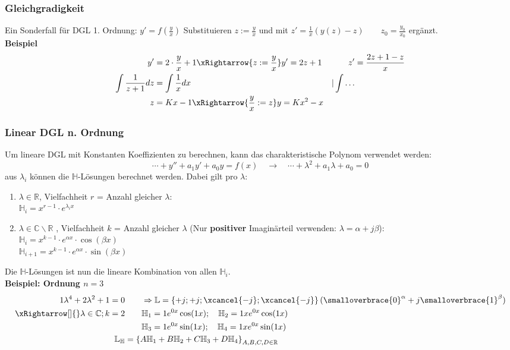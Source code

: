 \subsubsection{Gleichgradigkeit}
Ein Sonderfall für DGL 1. Ordnung: $y' = f(\frac{y}{x})$ Substituieren $z := \frac{y}{x}$ und mit $z' = \frac{1}{x}(y(z) - z)\qquad z_0 = \frac{y_0}{x_0}$ ergänzt.\\
\textbf{Beispiel} 
\begin{align*}
	y' &= 2 \cdot \frac{y}{x} + 1 \xRightarrow{z := \frac{y}{x}} y' = 2z + 1 & 	z' &= \frac{2z + 1 - z}{x}  \\
	\int \frac{1}{z+1}dz &= \int \frac{1}{x}dx & | \int \dots \\
	z &= Kx - 1 \xRightarrow{\frac{y}{x} := z} y = Kx^2 - x
\end{align*}

\subsubsection{Linear DGL n. Ordnung}
Um lineare DGL mit Konstanten Koeffizienten zu berechnen, kann das charakteristische Polynom verwendet werden:
\[
\cdots + y'' + a_1y' + a_0y = f(x) \quad\rightarrow\quad \cdots + \lambda^2 + a_1\lambda + a_0 = 0
\]
aus $\lambda_i$ können die $\mathbb{H}$-Lösungen berechnet werden. Dabei gilt pro $\lambda$:
\begin{enumerate}[nosep]
	\item $\lambda \in \mathbb{R}$, Vielfachheit $r$ = Anzahl gleicher $\lambda$:\\
	$\mathbb{H}_i = x^{r-1} \cdot e^{\lambda_i x}$
	\item $\lambda \in \mathbb{C}\backslash\mathbb{R}$ , Vielfachheit $k$ = Anzahl gleicher $\lambda$ (Nur \textbf{positiver} Imaginärteil verwenden: $\lambda = \alpha + j\beta$):\\
	$\mathbb{H}_i = x^{k-1} \cdot e^{\alpha x}\cdot \cos(\beta x)$\\
	$\mathbb{H}_{i+1} = x^{k-1} \cdot e^{\alpha x}\cdot \sin(\beta x)$  \\
\end{enumerate}

\noindent Die $\mathbb{H}$-Lösungen ist nun die lineare Kombination von allen $\mathbb{H}_i$.\\
\textbf{Beispiel: Ordnung $n=3$}
\begin{align*}
	1\lambda^4 + 2\lambda^2 + 1 = 0 &\qquad\Rightarrow \mathbb{L} = \left\{+j;+j;\xcancel{-j};\xcancel{-j}\right\} (\smalloverbrace{0}^\alpha + j\smalloverbrace{1}^\beta) \\
	\xRightarrow[]{} \lambda \in \mathbb{C}; k=2 &\qquad \mathbb{H}_1 = 1 e^{0x}\cos(1x); \quad \mathbb{H}_2 = 1xe^{0x}\cos(1x) \\
		                                         &\qquad \mathbb{H}_3 = 1 e^{0x}\sin(1x); \quad \mathbb{H}_4 = 1xe^{0x}\sin(1x) \\
	\mathbb{L}_\mathbb{H} &= \left\{A\mathbb{H}_1 + B\mathbb{H}_2+ C\mathbb{H}_3+ D\mathbb{H}_4 \right\}_{A,B,C,D\in\mathbb{R}}
\end{align*}

